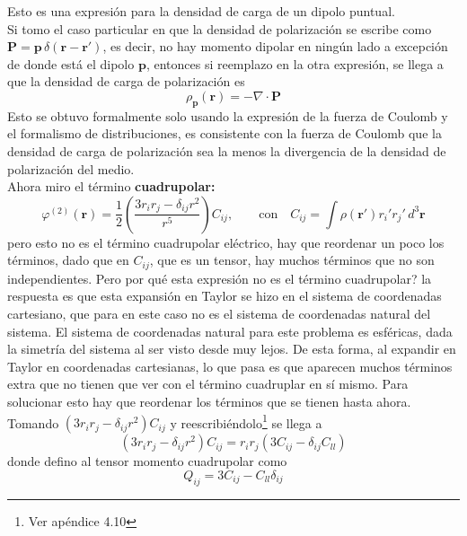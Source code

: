 Esto es una expresión para la densidad de carga de un dipolo puntual.\\
\indent Si tomo el caso particular en que la densidad de polarización se escribe como $\textbf{P} = \textbf{p}\,\delta(\textbf{r}-\textbf{r}')$, es decir, no hay momento dipolar en ningún lado a excepción de donde está el dipolo $\textbf{p}$, entonces si reemplazo en la otra expresión, se llega a que la densidad de carga de polarización es
\begin{equation}
    \rho_{\textbf{p}}(\textbf{r}) = -\nabla \cdot \textbf{P}
        \label{ec:DensidadeCargadePolarizacion}
\end{equation}
Esto se obtuvo formalmente solo usando la expresión de la fuerza de Coulomb y el formalismo de distribuciones, es consistente con la fuerza de Coulomb que la densidad de carga de polarización sea la menos la divergencia de la densidad de polarización del medio.\\
\indent Ahora miro el término \textbf{cuadrupolar:}
\begin{equation*}
    \varphi^{(2)}(\textbf{r})
    = 
    \frac{1}{2}
    \left(
        \frac{3r_{i}r_{j}- \delta_{ij}r^{2}}{r^{5}}
    \right)C_{ij},
    \quad
    \quad
    \mbox{con}
    \quad
    C_{ij} = \int \rho(\textbf{r}')r_{i}'r_{j}'\,d^{3}\textbf{r}
\end{equation*}
pero esto no es el término cuadrupolar eléctrico, hay que reordenar un poco los términos, dado que en $C_{ij}$, que es un tensor, hay muchos términos que no son independientes. Pero por qué esta expresión no es el término cuadrupolar? la respuesta es que esta expansión en Taylor se hizo en el sistema de coordenadas cartesiano, que para en este caso no es el sistema de coordenadas natural del sistema. El sistema de coordenadas natural para este problema es esféricas, dada la simetría del sistema al ser visto desde muy lejos. De esta forma, al expandir en Taylor en coordenadas cartesianas, lo que pasa es que aparecen muchos términos extra que no tienen que ver con el término cuadruplar en sí mismo. Para solucionar esto hay que reordenar los términos que se tienen hasta ahora.\\
\indent Tomando $(3r_{i}r_{j} - \delta_{ij}r^{2})C_{ij}$ y reescribiéndolo\footnote{Ver apéndice 4.10} se llega a
\begin{equation*}
    (3r_{i}r_{j} - \delta_{ij}r^{2})C_{ij} 
    = r_{i}r_{j}(3 C_{ij} - \delta_{ij}C_{ll})
\end{equation*}
donde defino al tensor momento cuadrupolar como
\begin{equation*}
    Q_{ij} = 3 C_{ij} - C_{ll}\delta_{ij}
\end{equation*}
